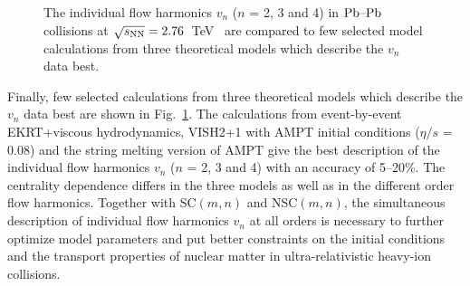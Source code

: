 \begin{figure}[h]
\begin{center}
        \caption{The individual flow harmonics $v_n$ ($n$ = 2, 3 and 4) in $\textnormal{Pb--Pb}$ collisions at $\sqrt{s_{\textnormal{NN}}}=2.76$~TeV~\cite{Adam:2016izf} are compared to few selected model calculations from three theoretical models which describe the $v_n$ data best.}
        \label{fig:Figure_A4}
              \end{center}
\end{figure}

Finally, few selected calculations from three theoretical models which describe the $v_n$ data best are shown in Fig.~\ref{fig:Figure_A4}.
The calculations from event-by-event EKRT+viscous hydrodynamics, VISH2+1 with AMPT initial conditions ($\eta/s$ = 0.08) and the string melting version of AMPT give the best description of the individual flow harmonics $v_n$ ($n$ = 2, 3 and 4) with an accuracy of 5--20\%. The centrality dependence differs in the three models as well as in the different order flow harmonics.
Together with SC$(m,n)$ and NSC$(m,n)$, the simultaneous description of individual flow harmonics $v_n$ at all orders is necessary to further optimize model parameters and put better constraints on the initial conditions and the transport properties of nuclear matter in ultra-relativistic heavy-ion collisions.
